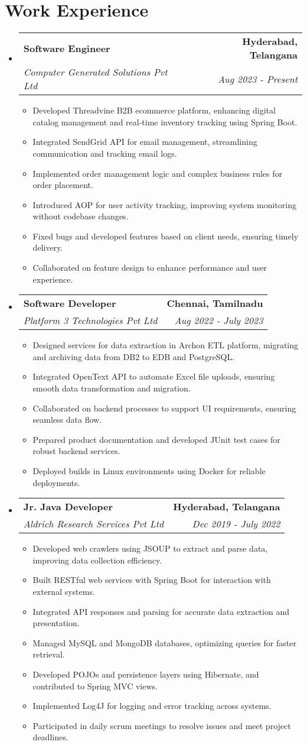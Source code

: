 \documentclass[letterpaper,10pt]{article}
\makeatletter
\newcommand{\resumeItem}[1]{
  \item\small{
    {#1 \vspace{-1pt}}
  }
}
\newcommand{\resumeSubheading}[4]{
  \vspace{-2pt}\item
    \begin{tabular*}{1.0\textwidth}[t]{l@{\extracolsep{\fill}}r}
      \textbf{#1} & \textbf{\small #2} \\
      \textit{\small#3} & \textit{\small #4} \\
    \end{tabular*}\vspace{-5pt}
}
\newcommand{\resumeSubHeadingListStart}{\begin{itemize}[leftmargin=0.0in, label={}]}
\newcommand{\resumeSubHeadingListEnd}{\end{itemize}}
\newcommand{\resumeItemListStart}{\begin{itemize}[leftmargin=0.1in, itemsep=1pt]}
\newcommand{\resumeItemListEnd}{\end{itemize}\vspace{-3pt}}
\makeatother
\begin{document}
\section{\color{airforceblue}Work Experience}
\resumeSubHeadingListStart
\resumeSubheading
{Software Engineer}{Hyderabad, Telangana}
{Computer Generated Solutions Pvt Ltd}{Aug 2023 - Present}
\resumeItemListStart
\resumeItem{Developed Threadvine B2B ecommerce platform, enhancing digital catalog management and real-time inventory tracking using Spring Boot.}
\resumeItem{Integrated SendGrid API for email management, streamlining communication and tracking email logs.}
\resumeItem{Implemented order management logic and complex business rules for order placement.}
\resumeItem{Introduced AOP for user activity tracking, improving system monitoring without codebase changes.}
\resumeItem{Fixed bugs and developed features based on client needs, ensuring timely delivery.}
\resumeItem{Collaborated on feature design to enhance performance and user experience.}
\resumeItemListEnd

\resumeSubheading
{Software Developer}{Chennai, Tamilnadu}
{Platform 3 Technologies Pvt Ltd}{Aug 2022 - July 2023}
\resumeItemListStart
\resumeItem{Designed services for data extraction in Archon ETL platform, migrating and archiving data from DB2 to EDB and PostgreSQL.}
\resumeItem{Integrated OpenText API to automate Excel file uploads, ensuring smooth data transformation and migration.}
\resumeItem{Collaborated on backend processes to support UI requirements, ensuring seamless data flow.}
\resumeItem{Prepared product documentation and developed JUnit test cases for robust backend services.}
\resumeItem{Deployed builds in Linux environments using Docker for reliable deployments.}
\resumeItemListEnd

\resumeSubheading
{Jr. Java Developer}{Hyderabad, Telangana}
{Aldrich Research Services Pvt Ltd}{Dec 2019 - July 2022}
\resumeItemListStart
\resumeItem{Developed web crawlers using JSOUP to extract and parse data, improving data collection efficiency.}
\resumeItem{Built RESTful web services with Spring Boot for interaction with external systems.}
\resumeItem{Integrated API responses and parsing for accurate data extraction and presentation.}
\resumeItem{Managed MySQL and MongoDB databases, optimizing queries for faster retrieval.}
\resumeItem{Developed POJOs and persistence layers using Hibernate, and contributed to Spring MVC views.}
\resumeItem{Implemented Log4J for logging and error tracking across systems.}
\resumeItem{Participated in daily scrum meetings to resolve issues and meet project deadlines.}
\resumeItemListEnd
\resumeSubHeadingListEnd
\end{document}
